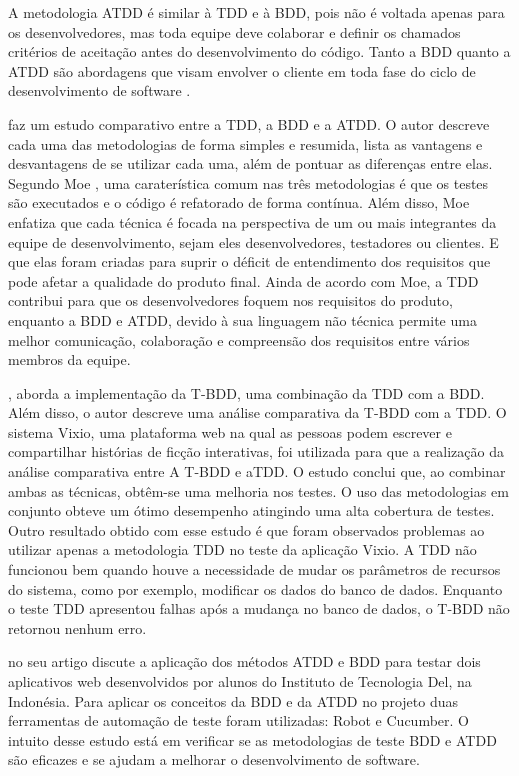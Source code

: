 A metodologia ATDD é similar à TDD e à BDD, pois não é voltada apenas para os desenvolvedores, mas toda equipe deve colaborar e definir os chamados critérios de aceitação antes do desenvolvimento do código. Tanto a BDD quanto a ATDD são abordagens que visam envolver o cliente em toda fase do ciclo de desenvolvimento de software \cite{barus2019implementaion}. 

\cite{moe2019comparative}  faz um estudo comparativo entre a TDD, a BDD e a ATDD. O autor descreve cada uma das metodologias de forma simples e resumida, lista as vantagens e desvantagens de se utilizar cada uma, além de pontuar as diferenças entre elas. 
Segundo Moe , uma caraterística comum nas três metodologias é que os testes são executados e o código é refatorado de forma contínua. Além disso, Moe enfatiza que cada técnica é focada na perspectiva de um ou mais integrantes da equipe de desenvolvimento, sejam eles desenvolvedores, testadores ou clientes. E que elas foram criadas para suprir o déficit de entendimento dos requisitos que pode afetar a qualidade do produto final. Ainda de acordo com Moe, a TDD contribui para que os desenvolvedores foquem nos requisitos do produto, enquanto a BDD e ATDD, devido à sua linguagem não técnica permite uma melhor comunicação, colaboração e compreensão dos requisitos entre vários membros da equipe.

\cite{manuaba2019combination}, aborda a implementação da T-BDD, uma  combinação da TDD com a BDD. Além disso, o autor descreve uma análise comparativa da T-BDD com a TDD. O sistema Vixio, uma plataforma web na qual as pessoas podem escrever e compartilhar histórias de ficção interativas, foi utilizada para que a realização da análise comparativa entre A T-BDD e aTDD. O estudo conclui que, ao combinar ambas as técnicas, obtêm-se uma melhoria nos testes. O uso das metodologias em conjunto obteve um ótimo desempenho atingindo uma alta cobertura de testes. Outro resultado obtido com esse estudo é que foram observados problemas ao utilizar apenas a metodologia TDD no teste da aplicação Vixio. A TDD não funcionou bem quando houve a necessidade de mudar os parâmetros de recursos do sistema, como por exemplo, modificar os dados do banco de dados. Enquanto o teste TDD apresentou falhas após a mudança no banco de dados, o T-BDD não retornou nenhum erro.  

\cite{barus2019implementaion} no seu artigo discute a aplicação dos métodos ATDD e BDD para testar dois aplicativos web desenvolvidos por alunos do Instituto de Tecnologia Del, na Indonésia. Para aplicar os conceitos da BDD e da ATDD no projeto duas ferramentas de automação de teste foram utilizadas: Robot e Cucumber. O intuito desse estudo está em verificar se as metodologias de teste BDD e ATDD são eficazes e se ajudam a melhorar o desenvolvimento de software. 

